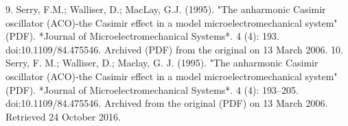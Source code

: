 \begin{enumerate}
9. Serry, F.M.; Walliser, D.; MacLay, G.J. (1995). "The anharmonic Casimir oscillator (ACO)-the Casimir effect in a model microelectromechanical system" (PDF). *Journal of Microelectromechanical Systems*. 4 (4): 193. doi:10.1109/84.475546. Archived (PDF) from the original on 13 March 2006.
10. Serry, F. M.; Walliser, D.; Maclay, G. J. (1995). "The anharmonic Casimir oscillator (ACO)-the Casimir effect in a model microelectromechanical system" (PDF). *Journal of Microelectromechanical Systems*. 4 (4): 193–205. doi:10.1109/84.475546. Archived from the original (PDF) on 13 March 2006. Retrieved 24 October 2016.
\end{enumerate}
